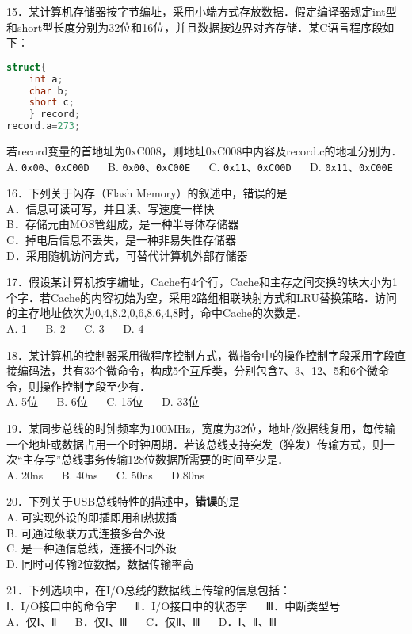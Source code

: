 15．某计算机存储器按字节编址，采用小端方式存放数据．假定编译器规定int型和short型长度分别为32位和16位，并且数据按边界对齐存储．某C语言程序段如下：\\
\begin{lstlisting}[language=cpp]
struct{
    int a;
    char b;
    short c;
    } record;
record.a=273;
\end{lstlisting}
若record变量的首地址为0xC008，则地址0xC008中内容及record.c的地址分别为．\\
A. \verb|0x00|、\verb|0xC00D| $\quad$ B. \verb|0x00|、\verb|0xC00E| $\quad$ C. \verb|0x11|、\verb|0xC00D|  $\quad$ D. \verb|0x11|、\verb|0xC00E|

16．下列关于闪存（Flash Memory）的叙述中，错误的是\\
A．信息可读可写，并且读、写速度一样快\\
B．存储元由MOS管组成，是一种半导体存储器\\
C．掉电后信息不丢失，是一种非易失性存储器\\
D．采用随机访问方式，可替代计算机外部存储器

17．假设某计算机按字编址，Cache有4个行，Cache和主存之间交换的块大小为1个字．若Cache的内容初始为空，采用2路组相联映射方式和LRU替换策略．访问的主存地址依次为0,4,8,2,0,6,8,6,4,8时，命中Cache的次数是．\\
A. 1 $\quad$ B. 2 $\quad$ C. 3 $\quad$ D. 4

18．某计算机的控制器采用微程序控制方式，微指令中的操作控制字段采用字段直接编码法，共有33个微命令，构成5个互斥类，分别包含7、3、12、5和6个微命令，则操作控制字段至少有．\\
A. 5位 $\quad$ B. 6位 $\quad$ C. 15位 $\quad$ D. 33位

19．某同步总线的时钟频率为100MHz，宽度为32位，地址/数据线复用，每传输一个地址或数据占用一个时钟周期．若该总线支持突发（猝发）传输方式，则一次“主存写”总线事务传输128位数据所需要的时间至少是．\\
A. 20ns $\quad$ B. 40ns $\quad$ C. 50ns $\quad$ D.80ns

20．下列关于USB总线特性的描述中，\textbf{错误}的是\\
A. 可实现外设的即插即用和热拔插\\
B. 可通过级联方式连接多台外设\\
C. 是一种通信总线，连接不同外设\\
D. 同时可传输2位数据，数据传输率高

21．下列选项中，在I/O总线的数据线上传输的信息包括：\\
Ⅰ．I/O接口中的命令字 $\quad$ Ⅱ．I/O接口中的状态字  $\quad$ Ⅲ．中断类型号\\
A．仅Ⅰ、Ⅱ $\quad$ B．仅Ⅰ、Ⅲ $\quad$ C．仅Ⅱ、Ⅲ $\quad$ D．Ⅰ、Ⅱ、Ⅲ

